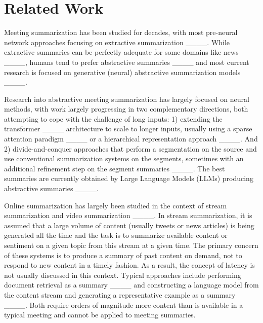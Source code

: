 \section{Related Work}

Meeting summarization has been studied for decades, with most pre-neural network approaches focusing on extractive summarization ____. While extractive summaries can be perfectly adequate for some domains like news ____, humans tend to prefer abstractive summaries ____ and most current research is focused on generative (neural) abstractive summarization models ____.

Research into abstractive meeting summarization has largely focused on neural methods, with work largely progressing in two complementary directions, both attempting to cope with the challenge of long inputs: 1) extending the transformer ____ architecture to scale to longer inputs, usually using a sparse attention paradigm ____ or a hierarchical representation approach ____. And 2) divide-and-conquer approaches that perform a segmentation on the source and use conventional summarization systems on the segments, sometimes with an additional refinement step on the segment summaries ____. The best summaries are currently obtained by Large Language Models (LLMs) producing abstractive summaries ____. %

Online summarization has largely been studied in the context of stream summarization and video summarization ____. In stream summarization, it is assumed that a large volume of content (usually tweets or news articles) is being generated all the time and the task is to summarize available content or sentiment on a given topic from this stream at a given time.
The primary concern of these systems is to produce a summary of past content on demand, not to respond to new content in a timely fashion. As a result, the concept of latency is not usually discussed in this context.
Typical approaches include performing document retrieval as a summary ____ and constructing a language model from the content stream and generating a representative example as a summary ____. Both require orders of magnitude more content than is available in a typical meeting and cannot be applied to meeting summaries.

